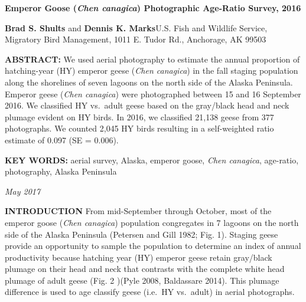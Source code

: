 \documentclass[]{article}
\title{}
\author{}
\date{}
\begin{document}
\pagestyle{fancy}
\renewcommand{\footrulewidth}{1pt} \renewcommand{\headrulewidth}{0pt}

\textbf{\LARGE{Emperor Goose (\textit{Chen canagica}) Photographic Age-Ratio Survey, 2016}}
\hfill

 \normalsize
\textbf{Brad S. Shults} and \textbf{Dennis K. Marks}\newline U.S. Fish
and Wildlife Service, Migratory Bird Management, 1011 E. Tudor Rd.,
Anchorage, AK 99503

\textbf{ABSTRACT:} We used aerial photography to estimate the annual
proportion of hatching-year (HY) emperor geese (\textit{Chen canagica})
in the fall staging population along the shorelines of seven lagoons on
the north side of the Alaska Peninsula. Emperor geese
(\textit{Chen canagica}) were photographed between 15 and 16 September
2016. We classified HY vs.~adult geese based on the gray/black head and
neck plumage evident on HY birds. In 2016, we classified 21,138 geese
from 377 photographs. We counted 2,045 HY birds resulting in a
self-weighted ratio estimate of 0.097 (SE = 0.006).

\textbf{KEY WORDS: }aerial survey, Alaska, emperor goose,
\textit{Chen canagica}, age-ratio, photography, Alaska Peninsula

\hfill\textit {May 2017}

\textbf{INTRODUCTION}\break
From mid-September through October, most of the emperor goose
(\textit{Chen canagica}) population congregates in 7 lagoons on the
north side of the Alaska Peninsula (Petersen and Gill 1982; Fig. 1).
Staging geese provide an opportunity to sample the population to
determine an index of annual productivity because hatching year (HY)
emperor geese retain gray/black plumage on their head and neck that
contrasts with the complete white head plumage of adult geese (Fig. 2
)(Pyle 2008, Baldassare 2014). This plumage difference is used to age
classify geese (i.e.~HY vs.~adult) in aerial photographs.
\end{document}
